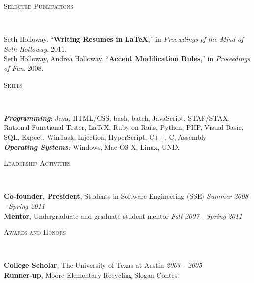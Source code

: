 \documentclass[9pt]{article}
\newenvironment{changemargin}[2]{%
  \begin{list}{}{%
    \setlength{\topsep}{0pt}%
    \setlength{\leftmargin}{#1}%
    \setlength{\rightmargin}{#2}%
    \setlength{\listparindent}{\parindent}%
    \setlength{\itemindent}{\parindent}%
    \setlength{\parsep}{\parskip}%
  }%
  \item[]}{\end{list}
}
\newcommand{\lineover}{
	\begin{changemargin}{-0.05in}{-0.05in}
		\vspace*{-8pt}
		\hrulefill \\
		\vspace*{-2pt}
	\end{changemargin}
}
\newcommand{\header}[1]{
	\begin{changemargin}{-0.5in}{-0.5in}
		\scshape{#1}\\
  	\lineover
	\end{changemargin}
}
\newenvironment{body} {
	\vspace*{-16pt}
	\begin{changemargin}{-0.25in}{-0.5in}
  }	
	{\end{changemargin}
}
\begin{document}
\smallskip



\header{Selected Publications}

\begin{body}
	\vspace{14pt}
	Seth Holloway. ``\textbf{Writing Resumes in LaTeX},'' in \emph{Proceedings of the Mind of Seth Holloway}. 2011.\\
	\smallskip
	Seth Holloway, Andrea Holloway. ``\textbf{Accent Modification Rules},'' in \emph{Proceedings of Fun}. 2008.\\
\end{body}

\smallskip


\header{Skills}

\begin{body}
	\vspace{14pt}
	\emph{\textbf{Programming:}}{} Java, HTML/CSS, bash, batch, JavaScript, STAF/STAX, Rational Functional Tester, \LaTeX, Ruby on Rails, Python, PHP, Visual Basic, SQL, Expect, WinTask, Injection, HyperScript, C++, C, Assembly\\
	\medskip
	\emph{\textbf{Operating Systems:}}{} Windows, Mac OS X, Linux, UNIX\\
\end{body}

\smallskip


\header{Leadership Activities}

\begin{body}
	\vspace{14pt}
	\textbf{Co-founder, President}, Students in Software Engineering (SSE) \hfill {} \emph{Summer 2008 - Spring 2011}\\
	\smallskip
	\textbf{Mentor}, Undergraduate and graduate student mentor \hfill{} \emph{Fall 2007 - Spring 2011}\\
\end{body}

\smallskip


\header{Awards and Honors}

\begin{body}
	\vspace{14pt}
	\textbf{College Scholar}, The University of Texas at Austin \hfill{} \emph{2003 - 2005}\\
	\smallskip
	\textbf{Runner-up}, Moore Elementary Recycling Slogan Contest
\end{body}
\end{document}
